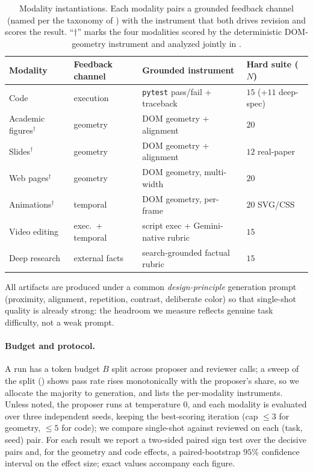 \begin{table}[t]
\centering
\small
\caption{Modality instantiations. Each modality pairs a grounded feedback channel (named per the taxonomy of ) with the instrument that both drives revision and scores the result. ``$\dagger$'' marks the four modalities scored by the deterministic DOM-geometry instrument and analyzed jointly in .}
\label{tab:setup}
\begin{tabular}{llll}
\toprule
Modality & Feedback channel & Grounded instrument & Hard suite ($N$) \\
\midrule
Code             & execution     & \texttt{pytest} pass/fail + traceback   & $15$ (+$11$ deep-spec) \\
Academic figures$^\dagger$ & geometry & DOM geometry + alignment           & $20$ \\
Slides$^\dagger$           & geometry & DOM geometry + alignment           & $12$ real-paper \\
Web pages$^\dagger$        & geometry & DOM geometry, multi-width          & $20$ \\
Animations$^\dagger$       & temporal & DOM geometry, per-frame            & $20$ SVG/CSS \\
Video editing    & exec.\ + temporal & script exec + Gemini-native rubric & $15$ \\
Deep research    & external facts & search-grounded factual rubric         & $15$ \\
\bottomrule
\end{tabular}
\end{table}

All artifacts are produced under a common \emph{design-principle} generation prompt (proximity, alignment, repetition, contrast, deliberate color) so that single-shot quality is already strong: the headroom we measure reflects genuine task difficulty, not a weak prompt.

\paragraph{Budget and protocol.} A run has a token budget $B$ split across proposer and reviewer calls; a sweep of the split () shows pass rate rises monotonically with the proposer's share, so we allocate the majority to generation, and  lists the per-modality instruments. Unless noted, the proposer runs at temperature $0$, and each modality is evaluated over three independent seeds, keeping the best-scoring iteration (cap $\le 3$ for geometry, $\le 5$ for code); we compare single-shot against reviewed on each (task, seed) pair. For each result we report a two-sided paired sign test over the decisive pairs and, for the geometry and code effects, a paired-bootstrap $95\%$ confidence interval on the effect size; exact values accompany each figure.
